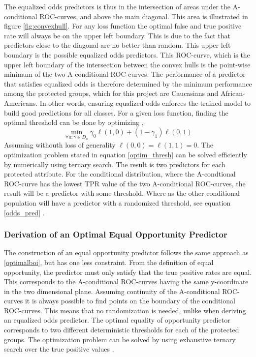 \documentclass[11pt, fleqn, titlepage]{article}
\begin{document}
	The equalized odds predictors is thus in the intersection of areas under the A-conditional ROC-curves, and above the main diagonal. This area is illustrated in figure \ref{fig:convexhull}. For any loss function the optimal false and true positive rate will always be on the upper left boundary. This is due to the fact that predictors close to the diagonal are no better than random. This upper left boundary is the possible equalized odds predictors. This ROC-curve, which is the upper left boundary of the intersection between the convex hulls is the point-wise minimum of the two A-conditional ROC-curves. The performance of a predictor that satisfies equalized odds is therefore determined by the minimum performance among the protected groups, which for this project are Caucasians and African-Americans. In other words, ensuring equalized odds enforces the trained model to build good predictions for all classes. For a given loss function, finding the optimal threshold can be done by optimizing ,
	\begin{equation}\label{optim_thresh}
	\min _{\forall a: \gamma \in D_{a}} \gamma_{0} \ell(1,0)+\left(1-\gamma_{1}\right) \ell(0,1)
	\end{equation}
	Assuming withouth loss of generality $ \ell (0,0) = \ell(1,1)=0 $.
	The optimization problem stated in equation \ref{optim_thresh} can be solved efficiently by numerically using ternary search. The result is two predictors for each protected attribute. For the conditional distribution, where the A-condtional ROC-curve has the lowest TPR value of the two A-conditional ROC-curves, the result will be a predictor with some threshold. Where as the other conditional population will have a predictor with a randomized threshold, see equation \ref{odds_pred} \cite{equal_of_oppor}.
	\subsubsection{Derivation of an Optimal Equal Opportunity Predictor}\label{optimalboi equal_oppor}
	
	The construction of an equal opportunity predictor follows the same approach as \ref{optimalboi}, but has one less constraint. From the definition of equal opportunity, the predictor must only satisfy that the true positive rates are equal. This corresponds to the A-conditional ROC-curves having the same y-coordinate in the two dimensional plane. Assuming continuity of the A-conditional ROC-curves it is always possible to find points on the boundary of the conditional ROC-curves. This means that no randomization is needed, unlike when deriving an equalized odds predictor. The optimal equality of opportunity predictor corresponds to two different deterministic thresholds for each of the protected groups. The optimization problem can be solved by using exhaustive ternary search over the true positive values \cite{equal_of_oppor}.
	
\end{document}
